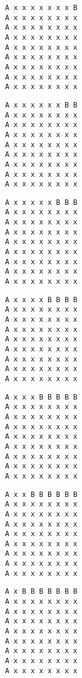 { \begin{verbatim}
         A x x x x x x x B
         A x x x x x x x x
         A x x x x x x x x
         A x x x x x x x x
         A x x x x x x x x
         A x x x x x x x x
         A x x x x x x x x
         A x x x x x x x x
         A x x x x x x x x
\end{verbatim} }

{ \begin{verbatim}
         A x x x x x x B B
         A x x x x x x x x
         A x x x x x x x x
         A x x x x x x x x
         A x x x x x x x x
         A x x x x x x x x
         A x x x x x x x x
         A x x x x x x x x
         A x x x x x x x x
\end{verbatim} }

{ \begin{verbatim}
         A x x x x x B B B
         A x x x x x x x x
         A x x x x x x x x
         A x x x x x x x x
         A x x x x x x x x
         A x x x x x x x x
         A x x x x x x x x
         A x x x x x x x x
         A x x x x x x x x
\end{verbatim} }

{ \begin{verbatim}
         A x x x x B B B B
         A x x x x x x x x
         A x x x x x x x x
         A x x x x x x x x
         A x x x x x x x x
         A x x x x x x x x
         A x x x x x x x x
         A x x x x x x x x
         A x x x x x x x x
\end{verbatim} }

{ \begin{verbatim}
         A x x x B B B B B
         A x x x x x x x x
         A x x x x x x x x
         A x x x x x x x x
         A x x x x x x x x
         A x x x x x x x x
         A x x x x x x x x
         A x x x x x x x x
         A x x x x x x x x
\end{verbatim} }

{ \begin{verbatim}
         A x x B B B B B B
         A x x x x x x x x
         A x x x x x x x x
         A x x x x x x x x
         A x x x x x x x x
         A x x x x x x x x
         A x x x x x x x x
         A x x x x x x x x
         A x x x x x x x x
\end{verbatim} }

{ \begin{verbatim}
         A x B B B B B B B
         A x x x x x x x x
         A x x x x x x x x
         A x x x x x x x x
         A x x x x x x x x
         A x x x x x x x x
         A x x x x x x x x
         A x x x x x x x x
         A x x x x x x x x
\end{verbatim} }

